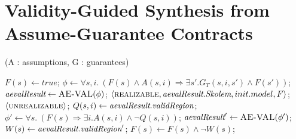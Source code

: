 \section{Validity-Guided Synthesis from Assume-Guarantee Contracts}
\label{sec:synthesis}

\begin{algorithm*}[!t]
\caption{\jsynvg (A : assumptions, G : guarantees)}
\label{alg:synthesis}
\begin{algorithmic}[1]
	\State $F(s) \gets true$;
		\State $\phi \gets \forall s,i. \ (F(s) \land A(s,i) \Rightarrow \exists s'.G_{T}(s,i,s') \land F(s'))$;
		\State $\textit{aevalResult} \gets \textsc{AE-VAL}(\phi)$;
		\If{$\isValid(\aevalres)$}
				\Return $\langle \textsc{realizable}, \textit{aevalResult}.\textit{Skolem}, init.model, F \rangle$;
		 		\Return $\langle \textsc{unrealizable} \rangle$;
		 	\EndIf
			\State $Q(s,i) \gets \textit{aevalResult}.\textit{validRegion}$;
			\State $\phi' \gets \forall s. \ (F(s) \Rightarrow \exists i. A(s,i) \land \lnot
			Q(s,i))$;
			\State $\textit{aevalResult}' \gets \textsc{AE-VAL}(\phi')$;
				\State $W(s) \gets \textit{aevalResult}.\textit{validRegion}'$;
			\State $F(s) \gets F(s) \land \lnot W(s)$;	
			
				
		\EndIf
	\EndWhile
\end{algorithmic}
\end{algorithm*}

